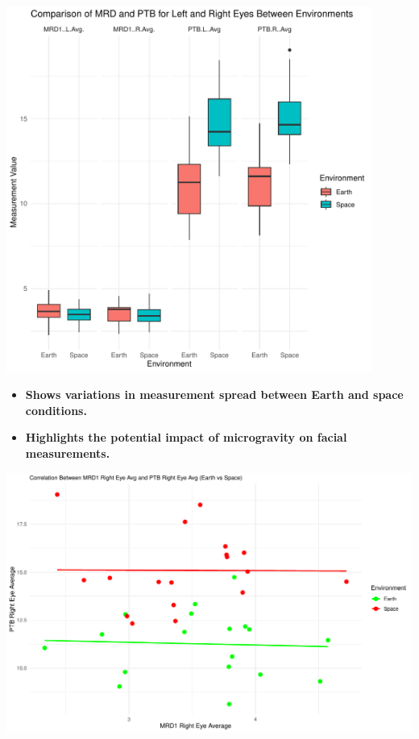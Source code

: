 \documentclass[a0paper,fleqn]{betterposter}
\begin{document}
{{\begin{minipage}[t]{0.45\textwidth}
\includegraphics[width=0.9\textwidth]{plots/Boxplot.pdf} \\
{\fontsize{30}{40}\selectfont  
\begin{itemize}
    \item \textbf{Shows variations in measurement spread between Earth and space conditions.}
    \item \textbf{Highlights the potential impact of microgravity on facial measurements.}
\end{itemize}
}
\end{minipage}
\hfill
\begin{minipage}[t]{0.45\textwidth}  %
\includegraphics[width=1\textwidth]{plots/Correlation_Plot.pdf} \\ 

\end{minipage}}}
\end{document}
